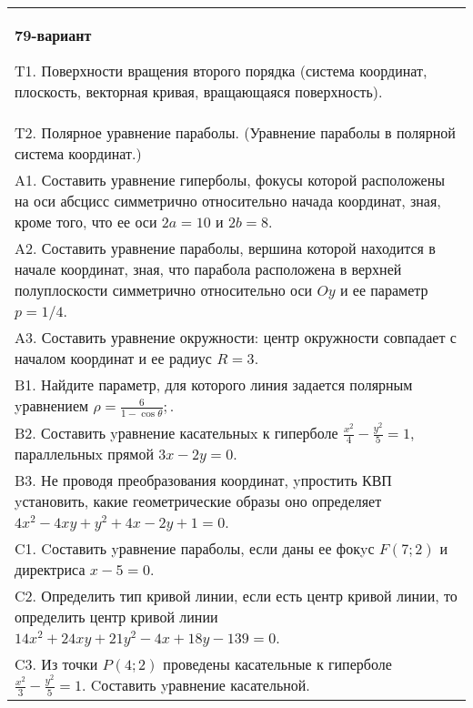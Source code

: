 \documentclass{article}
\begin{document}
\begin{tabular}{m{17cm}}
\textbf{79-вариант}
\newline

T1. Поверхности вращения второго порядка (система координат, плоскость, векторная кривая, вращающаяся поверхность).\\

T2. Полярное уравнение параболы. (Уравнение параболы в полярной система координат.)\\

A1. Составить уравнение гиперболы, фокусы которой расположены на оси абсцисс симметрично относительно начада координат, зная, кроме того, что ее оси $2a=10$ и $2b=8$.\\

A2. Составить уравнение параболы, вершина которой находится в начале координат, зная, что парабола расположена в верхней полуплоскости симметрично относительно оси $Oy$ и ее параметр $p=1/4$.\\

A3. Составить уравнение окружности: центр окружности совпадает с началом координат и ее радиус $R=3$.\\

B1. Найдите параметр, для которого линия задается полярным yравнением $\rho = \frac{6}{1 - \cos \theta};$.  \\

B2. Составить yравнение касательныx к гиперболе $\frac{x^{2}}{4} - \frac{y^{2}}{5} = 1$, параллельныx прямой $3x - 2y = 0$.  \\

B3. Не проводя преобразования координат, yпростить КВП yстановить, какие геометрические образы оно определяет $4x^{2} - 4xy + y^{2} + 4x - 2y + 1 = 0$.  \\

C1. Cоставить yравнение параболы, если даны ее фокyс $F(7;2)$ и директриса $x-5=0$.  \\

C2. Определить тип кривой линии, если есть центр кривой линии, то определить центр кривой линии $14x^{2}+24xy+21y^{2}-4x+18y-139=0$.  \\

C3. Из точки $P(4;2)$ проведены касательные к гиперболе $\frac{x^{2}}{3}-\frac{y^{2}}{5}=1$. Cоставить yравнение касательной.  \\

\end{tabular}
\vspace{1cm}
\end{document}
